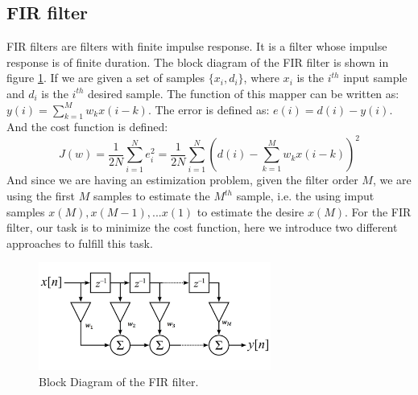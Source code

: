 \documentclass[conference]{IEEEtran}
\begin{document}
	\subsection{FIR filter} FIR filters are filters with finite impulse response\cite{b1}. It is a filter whose impulse response is of finite duration. The block diagram of the FIR filter is shown in figure \ref{fir}. If we are given a set of samples $\{x_i, d_i\}$, where $x_i$ is the $i^{th}$ input sample and $d_i$ is the $i^{th}$ desired sample. The function of this mapper can be written as: $y(i) = \sum_{k=1}^{M}w_{k}x(i-k)$. The error is defined as: $e(i) = d(i) - y(i)$. And the cost function is defined: 
	\begin{equation}J(w) = \displaystyle\frac{1}{2N}\sum_{i=1}^{N}e_i^2 = \displaystyle\frac{1}{2N}\sum_{i=1}^{N}(d(i) - \sum_{k=1}^{M}w_{k}x(i-k))^2\label{eq1}\end{equation}
	And since we are having an estimization problem, given the filter order $M$, we are using the first $M$ samples to estimate the $M^{th}$ sample, i.e. the using imput samples $x(M), x(M-1),...x(1)$ to estimate the desire $x(M)$.
For the FIR filter, our task is to minimize the cost function, here we introduce two different approaches to fulfill this task.
	\begin{figure}[htbp]
	\centerline{\includegraphics[width=3in]{FIRfilter.jpg}}
	\caption{Block Diagram of the FIR filter.}
	\label{fir}
	\end{figure}
\end{document}
